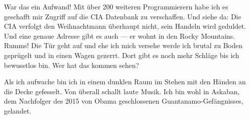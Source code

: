 War das ein Aufwand! Mit über 200 weiteren Programmierern habe ich es geschafft mir Zugriff auf die CIA Datenbank zu verschaffen. Und siehe da: Die CIA verfolgt den Weihnachtmann überhaupt nicht, sein Handeln wird geduldet. Und eine genaue Adresse gibt es auch — er wohnt in den Rocky Mountains. Rumms! Die Tür geht auf und ehe ich mich versehe werde ich brutal zu Boden geprügelt und in einen Wagen gezerrt. Dort gibt es noch mehr Schläge bis ich bewusstlos bin. Wer hat das kommen sehen?

Als ich aufwache bin ich in einem dunklen Raum im Stehen mit den Händen an die Decke gefesselt. Von überall schallt laute Musik. Ich bin wohl in Askaban, dem Nachfolger des 2015 von Obama geschlossenen Guantanamo-Gefängnisses, gelandet.